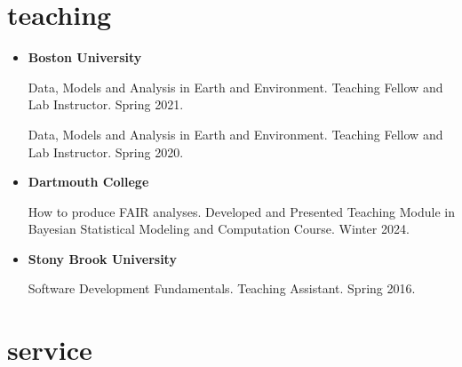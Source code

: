 \documentclass[10pt,oneside]{article}
\begin{document}

\section{teaching}

\mbox{}\vspace{-\dimexpr\baselineskip\relax}


\begin{itemize}[label={}]
  
  \item \textbf{Boston University}
        
        Data, Models and Analysis in Earth and Environment. Teaching Fellow and Lab Instructor. Spring 2021.
        
        Data, Models and Analysis in Earth and Environment. Teaching Fellow and Lab Instructor. Spring 2020.
        
        
  \item \textbf{Dartmouth College}
        
        How to produce FAIR analyses. Developed and Presented Teaching Module in Bayesian Statistical Modeling and Computation Course. Winter 2024.
        
        
  \item \textbf{Stony Brook University}
        
        Software Development Fundamentals. Teaching Assistant. Spring 2016.
        
        
\end{itemize}


\section{service}

\mbox{}\vspace{-\dimexpr\baselineskip\relax}
\end{document}
